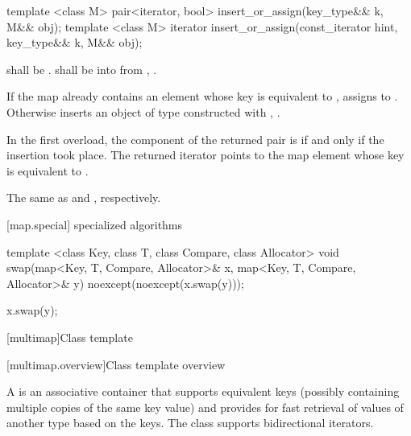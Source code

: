 %
%
\begin{itemdecl}
template <class M> pair<iterator, bool> insert_or_assign(key_type&& k, M&& obj);
template <class M> iterator insert_or_assign(const_iterator hint, key_type&& k, M&& obj);
\end{itemdecl}

\begin{itemdescr}
\pnum
\requires
{} shall be .
 shall be  into 
from , .

\pnum
\effects
If the map already contains an element 
whose key is equivalent to ,
assigns  to .
Otherwise inserts an object of type 
constructed with , .

\pnum
\returns
In the first overload,
the  component of the returned pair is 
if and only if the insertion took place.
The returned iterator points to the map element
whose key is equivalent to .

\pnum
\complexity
The same as  and ,
respectively.
\end{itemdescr}

[map.special]{ specialized algorithms}

%
%
\begin{itemdecl}
template <class Key, class T, class Compare, class Allocator>
  void swap(map<Key, T, Compare, Allocator>& x,
            map<Key, T, Compare, Allocator>& y)
    noexcept(noexcept(x.swap(y)));
\end{itemdecl}

\begin{itemdescr}
\pnum
\effects
\begin{codeblock}
x.swap(y);
\end{codeblock}
\end{itemdescr}

[multimap]{Class template }

[multimap.overview]{Class template  overview}

\pnum
{}%
A
is an associative container that supports equivalent keys (possibly containing multiple copies of
the same key value) and provides for fast retrieval of values of another type
based on the keys.
The
class
supports bidirectional iterators.

